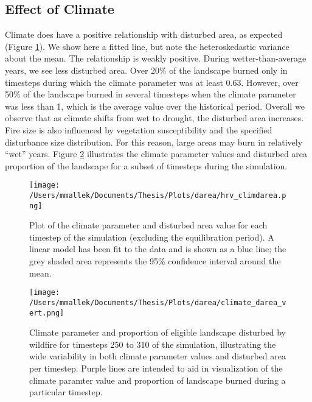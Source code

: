 
\subsection{Effect of Climate} 
Climate does have a positive relationship with disturbed area, as expected (Figure \ref{fig:climate_darea}). We show here a fitted line, but note the heteroskedastic variance about the mean. The relationship is weakly positive. During wetter-than-average years, we see less disturbed area. Over 20\% of the landscape burned only in timesteps during which the climate parameter was at least 0.63. However, over 50\% of the landscape burned in several timesteps when the climate parameter was less than 1, which is the average value over the historical period. Overall we observe that as climate shifts from wet to drought, the disturbed area increases. %
Fire size is also influenced by vegetation susceptibility and the specified disturbance size distribution. For this reason, large areas may burn in relatively ``wet'' years. Figure \ref{fig:compare_clim_darea} illustrates the climate parameter values and disturbed area proportion of the landscape for a subset of timesteps during the simulation.

\begin{figure}[!htbp]
  \centering
    \texttt{[image: /Users/mmallek/Documents/Thesis/Plots/darea/hrv\_climdarea.png]}
  \caption{Plot of the climate parameter and disturbed area value for each timestep of the simulation (excluding the equilibration period). A linear model has been fit to the data and is shown as a blue line; the grey shaded area represents the 95\% confidence interval around the mean.}
  \label{fig:climate_darea}
\end{figure}


\begin{figure}[!htbp]
\centering
\texttt{[image: /Users/mmallek/Documents/Thesis/Plots/darea/climate\_darea\_vert.png]}
\caption{Climate parameter and proportion of eligible landscape disturbed by wildfire for timesteps 250 to 310 of the simulation, illustrating the wide variability in both climate parameter values and disturbed area per timestep. Purple lines are intended to aid in visualization of the climate paramter value and proportion of landscape burned during a particular timestep.}
\label{fig:compare_clim_darea}
\end{figure}

